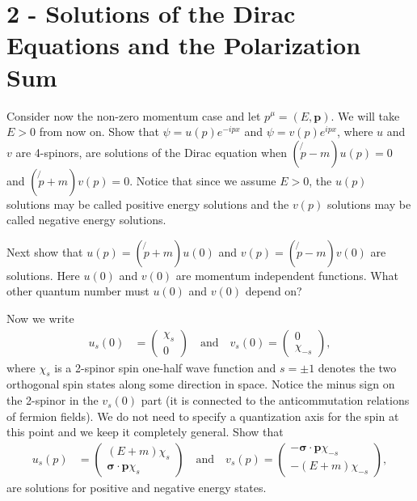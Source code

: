 \documentclass[working, oneside]{../../../Preambles/tuftebook}
\begin{document}
\let\cleardoublepage\clearpage
\thispagestyle{fancy}
\chapter{2 - Solutions of the Dirac Equations and the Polarization Sum}

\begin{exercise}[4]
Consider now the non-zero momentum case and let \( p^\mu = (E, \mathbf{p}) \). We will take \( E > 0 \) from now on. Show that \( \psi = u(p) e^{-i p x} \) and \( \psi = v(p) e^{i p x} \), where \( u \) and \( v \) are 4-spinors, are solutions of the Dirac equation when \( (\not{p} - m) u(p) = 0 \) and \( (\not{p} + m) v(p) = 0 \). Notice that since we assume \( E > 0 \), the \( u(p) \) solutions may be called positive energy solutions and the \( v(p) \) solutions may be called negative energy solutions.
\end{exercise}

\begin{exercise}[5]
Next show that \( u(p) = (\not{p} + m) u(0) \) and \( v(p) = (\not{p} - m) v(0) \) are solutions. Here \( u(0) \) and \( v(0) \) are momentum independent functions. What other quantum number must \( u(0) \) and \( v(0) \) depend on?
\end{exercise}

\begin{exercise}[6]
Now we write
\begin{align*}
u_s(0)
&= \begin{pmatrix} \chi_s \\ 0 \end{pmatrix} \quad \text{and} \quad v_s(0) = \begin{pmatrix} 0 \\ \chi_{-s} \end{pmatrix}, \tag{12}
\end{align*}
where \( \chi_s \) is a 2-spinor spin one-half wave function and \( s = \pm 1 \) denotes the two orthogonal spin states along some direction in space. Notice the minus sign on the 2-spinor in the \( v_s(0) \) part (it is connected to the anticommutation relations of fermion fields). We do not need to specify a quantization axis for the spin at this point and we keep it completely general. Show that
\begin{align*}
u_s(p)
&= \begin{pmatrix} (E + m) \chi_s \\ \boldsymbol{\sigma} \cdot \mathbf{p} \chi_s \end{pmatrix} \quad \text{and} \quad v_s(p) = \begin{pmatrix} - \boldsymbol{\sigma} \cdot \mathbf{p} \chi_{-s} \\ -(E + m) \chi_{-s} \end{pmatrix}, \tag{13}
\end{align*}
are solutions for positive and negative energy states.
\end{exercise}
\end{document}
